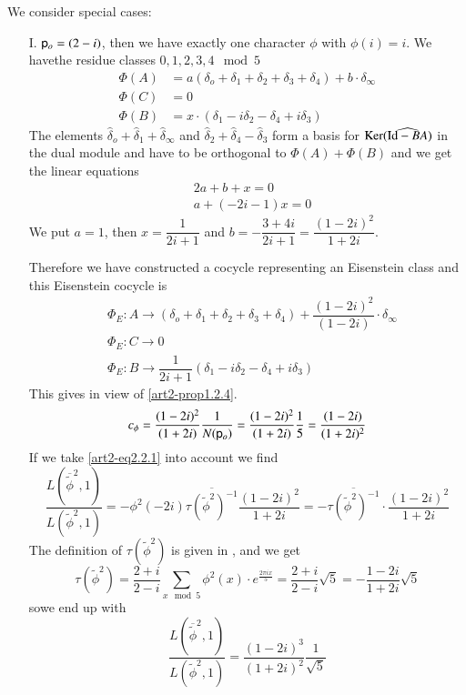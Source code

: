 We consider special cases:
\begin{itemize}
\item[I.] $\mathsf{p}_{o}=(2-i)$, then we have exactly one character $\phi$ with $\phi(i)=i$. We have\pageoriginale the residue classes $0,1,2,3,4\mod 5$
\begin{align*}
\Phi(A) &= a(\delta_{o}+\delta_{1}+\delta_{2}+\delta_{3}+\delta_{4})+b\cdot \delta_{\infty}\\
\Phi(C) &= 0\\
\Phi(B) &= x\cdot (\delta_{1}-i\delta_{2}-\delta_{4}+i\delta_{3})
\end{align*}
The elements $\widehat{\delta}_{o}+\widehat{\delta}_{1}+\widehat{\delta}_{\infty}$ and $\widehat{\delta}_{2}+\widehat{\delta}_{4}-\widehat{\delta}_{3}$ form a basis for $\operatorname{Ker} (\widehat{\mathrm{Id}-BA})$ in the dual module and have to be orthogonal to $\Phi(A)+\Phi(B)$ and we get the linear equations
\begin{align*}
& 2a+b+x=0\\
& a+(-2i-1)x=0
\end{align*}
We put $a=1$, then $x=\dfrac{1}{2i+1}$ and $b=-\dfrac{3+4i}{2i+1}=\dfrac{(1-2i)^{2}}{1+2i}$.

Therefore we have constructed a cocycle representing an Eisenstein class and this Eisenstein cocycle is
\begin{align*}
&\Phi_{E}:A\to (\delta_{o}+\delta_{1}+\delta_{2}+\delta_{3}+\delta_{4})+\dfrac{(1-2i)^{2}}{(1-2i)}\cdot \delta_{\infty}\\
&\Phi_{E}:C\to 0\\
&\Phi_{E}:B\to \dfrac{1}{2i+1}(\delta_{1}-i\delta_{2}-\delta_{4}+i\delta_{3})
\end{align*}
This gives in view of \ref{art2-prop1.2.4}.
$$
c_{\phi}=\dfrac{(1-2i)^{2}}{(1+2i)}\dfrac{1}{N(\mathsf{p}_{o})}=\dfrac{(1-2i)^{2}}{(1+2i)}\dfrac{1}{5}=\dfrac{(1-2i)}{(1+2i)^{2}}
$$
If we take \eqref{art2-eq2.2.1} into account we find
$$
\dfrac{L(\overline{\widetilde{\phi}}^{2},1)}{L(\widetilde{\phi}^{2},1)}=-\phi^{2}(-2i)\overline{\tau(\widetilde{\phi}^{2})^{-1}}\dfrac{(1-2i)^{2}}{1+2i}=-\overline{\tau(\widetilde{\phi}^{2})^{-1}}\cdot \dfrac{(1-2i)^{2}}{1+2i}
$$
The definition of $\tau(\widetilde{\phi}^{2})$ is given in \cite{art2-key12}, and we get
$$
\tau(\widetilde{\phi}^{2})=\dfrac{2+i}{2-i}\sum\limits_{x\mod 5}\phi^{2}(x)\cdot e^{\frac{2\pi ix}{5}}=\dfrac{2+i}{2-i}\sqrt{5}=-\dfrac{1-2i}{1+2i}\sqrt{5}
$$
so\pageoriginale we end up with
$$
\dfrac{L(\overline{\widetilde{\phi}}^{2},1)}{L(\widetilde{\phi}^{2},1)}=\dfrac{(1-2i)^{3}}{(1+2i)^{2}}\dfrac{1}{\sqrt{5}}
$$


\end{itemize}
